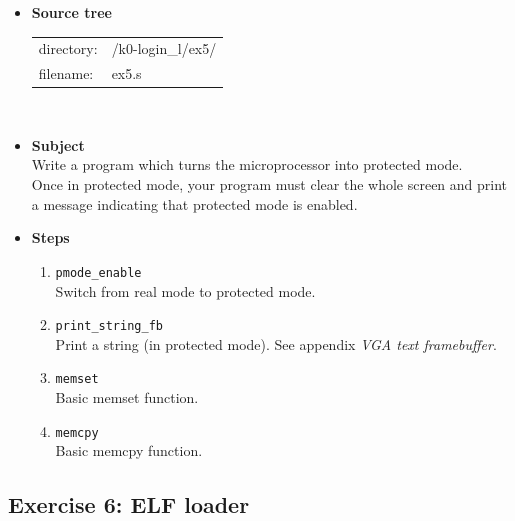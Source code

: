 \begin{itemize}
\item {\bf Source tree}\\
\begin{tabular}{p{4cm}l}
directory: & /k0-login\_l/ex5/\\
filename: & ex5.s
\end{tabular}
\\
\item {\bf Subject}\\
Write a program which turns the microprocessor into protected mode.\\
Once in protected mode, your program must clear the whole screen and print a message
indicating that protected mode is enabled.
\item {\bf Steps}
  \begin{enumerate}
  \item {\tt pmode\_enable}\\
  Switch from real mode to protected mode.
  \item {\tt print\_string\_fb}\\
  Print a string (in protected mode). See appendix \emph{VGA text
  framebuffer}.
  \item {\tt memset}\\
  Basic memset function.
  \item {\tt memcpy}\\
  Basic memcpy function.
  \end{enumerate}
\end{itemize}

\newpage

\subsection*{Exercise 6: ELF loader}

